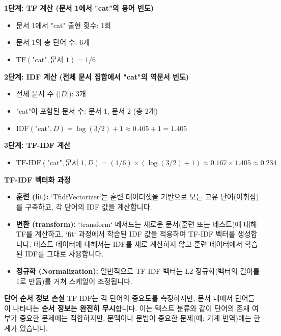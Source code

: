 \documentclass[11pt,a4paper]{article}
\begin{document}
\begin{enumerate}
\begin{examplebox}
    \textbf{1단계: TF 계산 (문서 1에서 "cat"의 용어 빈도)}
    \begin{itemize}
        \item 문서 1에서 "cat" 출현 횟수: 1회
        \item 문서 1의 총 단어 수: 6개
        \item $\text{TF}(\text{"cat"}, \text{문서 1}) = 1/6$
    \end{itemize}

    \textbf{2단계: IDF 계산 (전체 문서 집합에서 "cat"의 역문서 빈도)}
    \begin{itemize}
        \item 전체 문서 수 ($|D|$): 3개
        \item "cat"이 포함된 문서 수: 문서 1, 문서 2 (총 2개)
        \item $\text{IDF}(\text{"cat"}, D) = \log(3/2) + 1 \approx 0.405 + 1 = 1.405$
    \end{itemize}

    \textbf{3단계: TF-IDF 계산}
    \begin{itemize}
        \item $\text{TF-IDF}(\text{"cat"}, \text{문서 1}, D) = (1/6) \times (\log(3/2) + 1) \approx 0.167 \times 1.405 \approx 0.234$
    \end{itemize}
    \end{examplebox}

    \begin{tipbox}
    \textbf{TF-IDF 벡터화 과정}
    \begin{itemize}
        \item \textbf{훈련 (fit):} `TfidfVectorizer`는 훈련 데이터셋을 기반으로 모든 고유 단어(어휘집)를 구축하고, 각 단어의 IDF 값을 계산합니다.
        \item \textbf{변환 (transform):} `transform` 메서드는 새로운 문서(훈련 또는 테스트)에 대해 TF를 계산하고, `fit` 과정에서 학습된 IDF 값을 적용하여 TF-IDF 벡터를 생성합니다. 테스트 데이터에 대해서는 IDF를 새로 계산하지 않고 훈련 데이터에서 학습된 IDF를 그대로 사용합니다.
        \item \textbf{정규화 (Normalization):} 일반적으로 TF-IDF 벡터는 L2 정규화(벡터의 길이를 1로 만듦)를 거쳐 스케일이 조정됩니다.
    \end{itemize}
    \end{tipbox}

    \begin{cautionbox}
    \textbf{단어 순서 정보 손실}
    TF-IDF는 각 단어의 중요도를 측정하지만, 문서 내에서 단어들이 나타나는 \textbf{순서 정보는 완전히 무시}합니다. 이는 텍스트 분류와 같이 단어의 존재 여부가 중요한 문제에는 적합하지만, 문맥이나 문법이 중요한 문제(예: 기계 번역)에는 한계가 있습니다.
    \end{cautionbox}
\end{enumerate}
\end{document}
